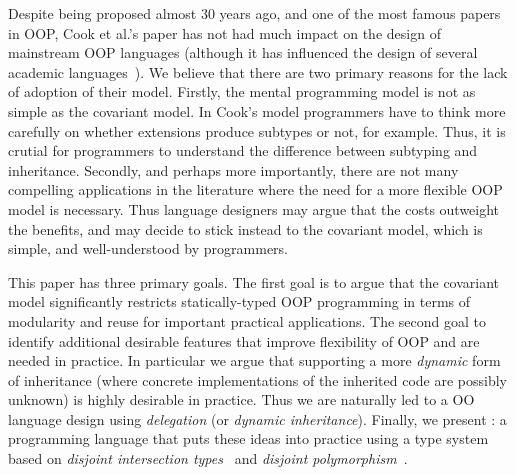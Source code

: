 \begin{comment}
\begin{itemize}

\item {\bf Inheritance and subtyping should be decoupled:} 
That is, there should be different mechanisms for class inheritance 
and class/interface subtyping. 

\item {\bf Extensions do not always produce subtypes:} 
There are cases where classes can inherit from other classes without 
producing subtypes. 

\end{itemize}

\end{comment}

Despite being proposed almost 30 years ago, and one of the most
famous papers in OOP, Cook et al.'s paper has not had much impact 
on the design of mainstream OOP languages (although it has influenced 
the design of several academic languages~\cite{}).
We believe that there are two primary reasons for the lack of adoption
of their model.  Firstly, the mental programming model is not
as simple as the covariant model. In Cook's model programmers have to
think more carefully on whether extensions produce subtypes or not,
for example.  Thus, it is crutial for programmers to understand the
difference between subtyping and inheritance.
Secondly, and perhaps more importantly, there are not many compelling applications in
the literature where the need for a more flexible OOP model is
necessary. Thus language designers may argue that the costs outweight 
the benefits, and may decide to stick instead to the covariant 
model, which is simple, and well-understood by programmers. 

This paper has three primary goals. The first goal is to argue that the
covariant model significantly restricts statically-typed OOP
programming in terms of modularity and reuse for important practical
applications. The second goal to identify additional desirable
features that improve flexibility of OOP and are needed in practice.
In particular we argue that supporting a more \emph{dynamic}
form of inheritance (where concrete implementations of the inherited
code are possibly unknown) is highly desirable in practice. Thus 
we are naturally led to a OO language design using \emph{delegation} (or \emph{dynamic inheritance}).
Finally, we present \name: a programming language that puts these 
ideas into practice using a type system based on 
\emph{disjoint intersection types}~\cite{oliveira2016disjoint} and \emph{disjoint
polymorphism}~\cite{alpuimdisjoint}.


